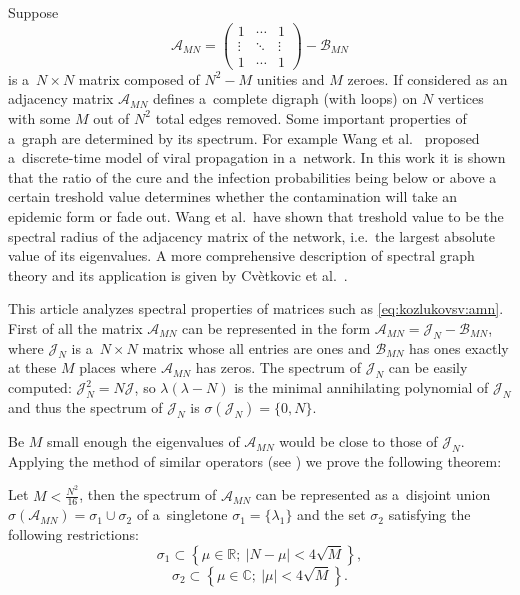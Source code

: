 Suppose
\begin{equation}\label{eq:kozlukovsv:amn}
    \mathscr{A}_{MN} =
    \begin{pmatrix}
        1 & \cdots & 1 \\
        \vdots & \ddots & \vdots \\
        1 & \cdots & 1
    \end{pmatrix} - \mathscr{B}_{MN}
\end{equation}
    is a~\( N\times N \) matrix composed of
    \( N^2 - M \) unities and \( M \) zeroes.
If considered as an adjacency matrix \( \mathscr{A}_{MN} \)
    defines a~complete digraph (with loops) on \( N \) vertices
    with some \( M \) out of \( N^2 \) total edges removed.
Some important properties of a~graph are determined by its spectrum.
For example Wang et al.\ \cite{epidemic} proposed a~discrete-time model
    of viral propagation in a~network.
In this work it is shown that the ratio
    of the cure and the infection probabilities
    being below or above a certain treshold value
    determines whether the contamination will take an epidemic form
    or fade out.
Wang et al.\ have shown that treshold value
    to be the spectral radius of the adjacency matrix of the network,
    i.e.\ the largest absolute value of its eigenvalues.
A more comprehensive description of spectral graph theory
    and its application is given by Cv\`etkovic et al.\ \cite{cvet}.

This article analyzes spectral properties of matrices such as \eqref{eq:kozlukovsv:amn}.
First of all the matrix \( \mathscr{A}_{MN} \) can be represented in the form
    \( \mathscr{A}_{MN} = \mathcal{J}_N - \mathscr{B}_{MN} \),
    where \( \mathcal{J}_N \) is a~\( N\times N \) matrix
    whose all entries are ones
    and \( \mathcal{B}_{MN} \) has ones exactly at these \( M \)
    places where \( \mathscr{A}_{MN} \) has zeros.
The spectrum of \( \mathcal{J}_N \) can be easily computed:
    \( \mathcal{J}_N^2 = N \mathcal{J} \),
    so \( \lambda(\lambda - N) \) is the minimal
    annihilating polynomial of \( \mathcal{J}_N \)
    and thus the spectrum of \( \mathcal{J}_{N} \) is
    \( \sigma(\mathcal{J}_N) = \{ 0,N \} \).

Be \( M \) small enough
    the eigenvalues of \( \mathscr{A}_{MN} \) would be close to those of \( \mathcal{J}_N \).
Applying the method of similar operators (see \cite{baskakov-harmonic,baskakov-split})
    we prove the following theorem:
\begin{thm}\label{kozlukovsv:thm:almost-all-ones}
    Let \( M < \frac{N^2}{16} \),
    then the spectrum of \( \mathscr{A}_{MN} \)
    can be represented as a~disjoint union
    \( \sigma\left(\mathscr{A}_{MN}\right) = \sigma_1 \cup \sigma_2 \)
    of a~singletone \( \sigma_1=\{\lambda_1\} \)
    and the set \( \sigma_2 \) satisfying the following restrictions:
    \[
        \sigma_1 \subset \left\{
            \mu\in\mathbb{R};\ \lvert N - \mu \rvert < 4\sqrt{M}
            \right\},
        \]
    \[ \sigma_2 \subset \left\{ \mu\in\mathbb{C};\ \lvert \mu \rvert < 4\sqrt{M} \right\}. \]
\end{thm}

